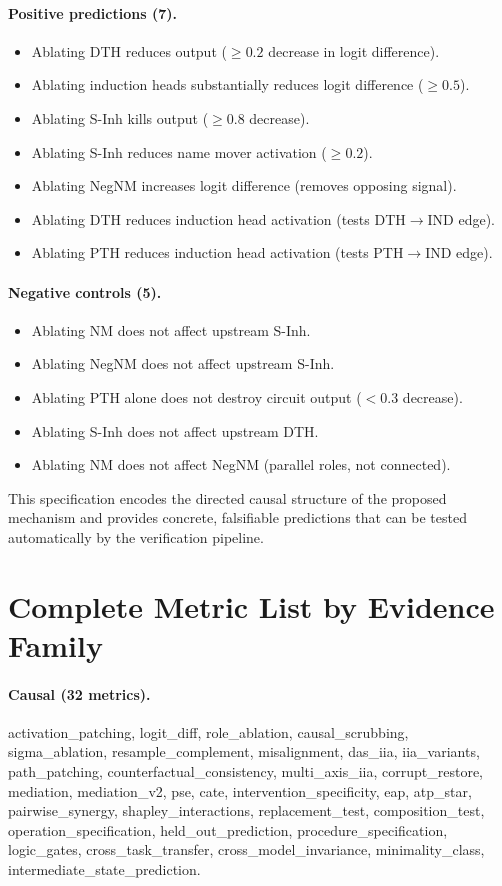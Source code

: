 \documentclass[10pt]{article}
\begin{document}
\paragraph{Positive predictions (7).}
\begin{itemize}[nosep]
    \item Ablating DTH reduces output ($\geq 0.2$ decrease in logit difference).
    \item Ablating induction heads substantially reduces logit difference ($\geq 0.5$).
    \item Ablating S-Inh kills output ($\geq 0.8$ decrease).
    \item Ablating S-Inh reduces name mover activation ($\geq 0.2$).
    \item Ablating NegNM increases logit difference (removes opposing signal).
    \item Ablating DTH reduces induction head activation (tests DTH$\rightarrow$IND edge).
    \item Ablating PTH reduces induction head activation (tests PTH$\rightarrow$IND edge).
\end{itemize}

\paragraph{Negative controls (5).}
\begin{itemize}[nosep]
    \item Ablating NM does not affect upstream S-Inh.
    \item Ablating NegNM does not affect upstream S-Inh.
    \item Ablating PTH alone does not destroy circuit output ($< 0.3$ decrease).
    \item Ablating S-Inh does not affect upstream DTH.
    \item Ablating NM does not affect NegNM (parallel roles, not connected).
\end{itemize}

This specification encodes the directed causal structure of the proposed mechanism and provides concrete, falsifiable predictions that can be tested automatically by the verification pipeline.

\section{Complete Metric List by Evidence Family}
\label{app:metrics}

\paragraph{Causal (32 metrics).} activation\_patching, logit\_diff, role\_ablation, causal\_scrubbing, sigma\_ablation, resample\_complement, misalignment, das\_iia, iia\_variants, path\_patching, counterfactual\_consistency, multi\_axis\_iia, corrupt\_restore, mediation, mediation\_v2, pse, cate, intervention\_specificity, eap, atp\_star, pairwise\_synergy, shapley\_interactions, replacement\_test, composition\_test, operation\_specification, held\_out\_prediction, procedure\_specification, logic\_gates, cross\_task\_transfer, cross\_model\_invariance, minimality\_class, intermediate\_state\_prediction.
\end{document}
